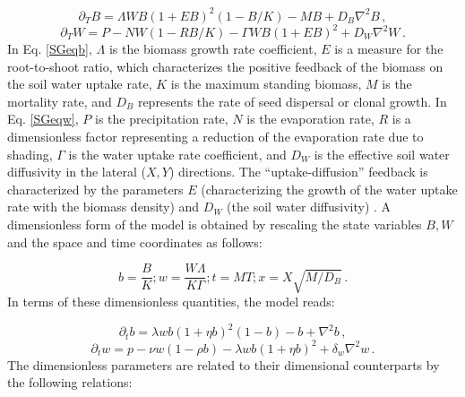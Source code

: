 \documentclass[aps,prl,preprint,superscriptaddress,floatfix]{revtex4-1}
\begin{document}
\begin{equation}
\partial_T B = \Lambda WB(1 + E B)^2(1 - B/K) - M B + D_B\nabla^2B \,, \label{SGeqb}
\end{equation}
\begin{equation}
\partial_T W = P - N W (1-R B/K) - \Gamma WB(1 + E B)^2  + D_W\nabla^2 W\,. \label{SGeqw}
\end{equation}
In Eq. \eqref{SGeqb}, $\Lambda$ is the biomass growth rate coefficient, $E$ is a measure for the root-to-shoot ratio, which characterizes the positive feedback of the biomass on the soil water uptake rate,
$K$ is the maximum standing biomass, $M$ is the mortality rate, and $D_B$ represents the rate of seed dispersal or clonal growth. 
In Eq. \eqref{SGeqw}, $P$ is the precipitation rate, $N$ is the evaporation rate, $R$ is a dimensionless factor representing a reduction of the evaporation rate due to shading, 
$\Gamma$ is the water uptake rate coefficient, and $D_W$ is the effective soil water diffusivity in the lateral ($X,Y$) directions.
The ``uptake-diffusion'' feedback is characterized by the parameters $E$ (characterizing the growth of the water uptake rate with the biomass density) and $D_W$ (the soil water diffusivity) \cite{Kinast2014prl}. 
A dimensionless form of the model is obtained by rescaling the state variables $B,W$ and the space and time coordinates as follows:

\begin{equation}
    b = \frac{B}{K}; w = \frac{W\Lambda}{K \Gamma}; t = M T; x = X\sqrt{M/D_B}\,.
\end{equation}
In terms of these dimensionless quantities, the model reads:

\begin{equation}
\partial_t b = \lambda w b(1 + \eta b)^2(1 - b) - b + \nabla^2b \,, \label{ndSGeqb}
\end{equation}
\begin{equation}
\partial_t w = p - \nu w (1-\rho b) - \lambda w b(1 + \eta b)^2  + \delta_w\nabla^2 w\,. \label{ndSGeqw}
\end{equation}
The dimensionless parameters are related to their dimensional counterparts by the following relations:
\end{document}
